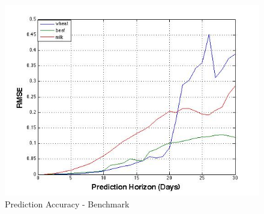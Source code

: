 \begin{figure}[H]
        \centering
         \includegraphics[width=1\textwidth ]{img/model/prediction_days_1}      
        \caption{Prediction Accuracy - Benchmark }
        \label{fig:res_1}
\end{figure}




